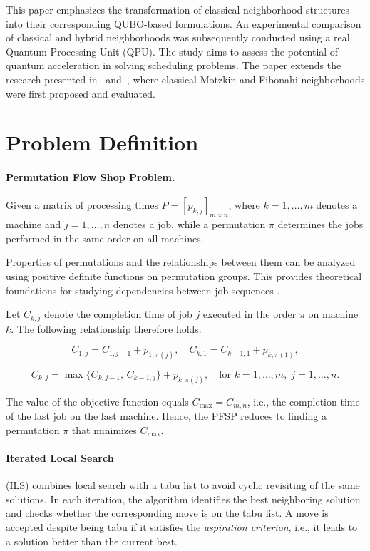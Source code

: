 \documentclass[10pt,twoside,twocolumn,a4paper]{article}
\begin{document}
This paper emphasizes the transformation of classical neighborhood structures into their corresponding QUBO-based formulations. An experimental comparison of classical and hybrid neighborhoods was subsequently conducted using a real Quantum Processing Unit (QPU). The study aims to assess the potential of quantum acceleration in solving scheduling problems. The paper extends the research presented in~\cite{Motzkin_PWR} and~\cite{WojewodzkiBozejko2026}, where classical Motzkin and Fibonahi neighborhoods were first proposed and evaluated.

\section{Problem Definition}
\paragraph{Permutation Flow Shop Problem.}
Given a matrix of processing times $P = [p_{k,j}]_{m \times n}$, where $k=1,\dots,m$ denotes a machine and $j=1,\dots,n$ denotes a job, while a permutation $\pi$ determines the jobs performed in the same order on all machines.

Properties of permutations and the relationships between them can be analyzed using positive definite functions on permutation groups. This provides theoretical foundations for studying dependencies between job sequences \cite{Bozejko2015}.

Let $C_{k,j}$ denote the completion time of job $j$ executed in the order $\pi$ on machine $k$. The following relationship therefore holds:

\begin{equation}\label{eq_c_1j_C_k1}
    C_{1,j} = C_{1,j-1} + p_{1,\pi(j)},\quad
    C_{k,1} = C_{k-1,1} + p_{k,\pi(1)},
\end{equation}

\begin{equation}\label{eq_c_kj}
C_{k,j} = \max\{C_{k,j-1},\, C_{k-1,j}\} + p_{k,\pi(j)}, \quad \text{for } k=1,\dots,m,\; j=1,\dots,n.
\end{equation}

The value of the objective function equals $C_{\max} = C_{m,n}$, i.e., the completion time of the last job on the last machine. Hence, the PFSP reduces to finding a permutation $\pi$ that minimizes $C_{\max}$.


\paragraph{Iterated Local Search} (ILS) combines local search with a tabu list to avoid cyclic revisiting of the same solutions. In each iteration, the algorithm identifies the best neighboring solution and checks whether the corresponding move is on the tabu list. A move is accepted despite being tabu if it satisfies the \emph{aspiration criterion}, i.e., it leads to a solution better than the current best.
\end{document}
